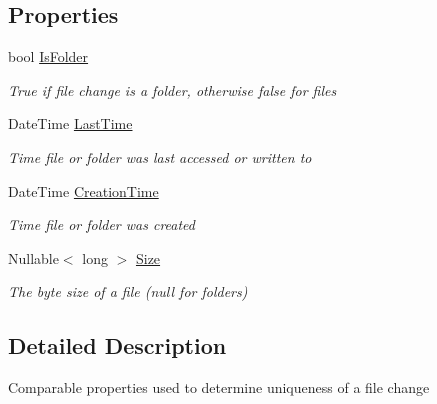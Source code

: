\subsection*{Properties}
\begin{DoxyCompactItemize}
\item 
bool \hyperlink{struct_cloud_api_public_1_1_model_1_1_file_metadata_hashable_properties_accefde1677467dee8550cbf135e34462}{Is\-Folder}
\begin{DoxyCompactList}\small\item\em True if file change is a folder, otherwise false for files \end{DoxyCompactList}\item 
Date\-Time \hyperlink{struct_cloud_api_public_1_1_model_1_1_file_metadata_hashable_properties_acd7f344854e4ea86f521c7886498b6f2}{Last\-Time}
\begin{DoxyCompactList}\small\item\em Time file or folder was last accessed or written to \end{DoxyCompactList}\item 
Date\-Time \hyperlink{struct_cloud_api_public_1_1_model_1_1_file_metadata_hashable_properties_acc9e7b94fe931b9ddfd72792c49ba9f8}{Creation\-Time}
\begin{DoxyCompactList}\small\item\em Time file or folder was created \end{DoxyCompactList}\item 
Nullable$<$ long $>$ \hyperlink{struct_cloud_api_public_1_1_model_1_1_file_metadata_hashable_properties_ade86f4137b38370bc8a7e3e73721a2a2}{Size}
\begin{DoxyCompactList}\small\item\em The byte size of a file (null for folders) \end{DoxyCompactList}\end{DoxyCompactItemize}


\subsection{Detailed Description}
Comparable properties used to determine uniqueness of a file change 




